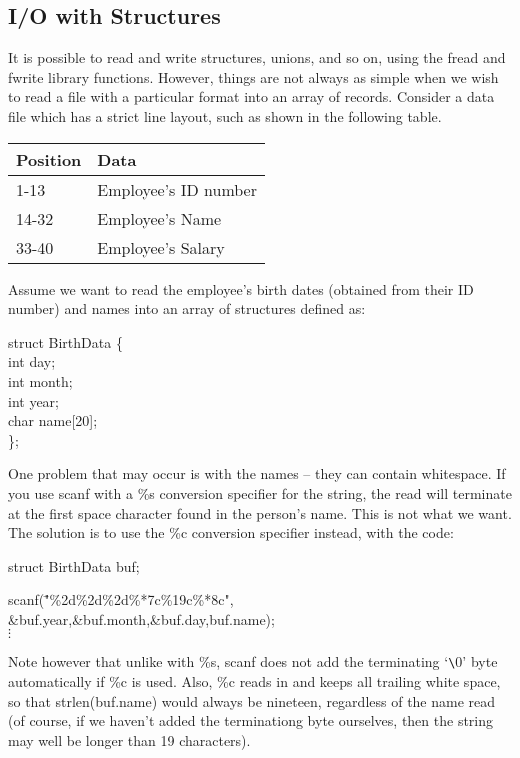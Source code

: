 \subsection{I/O with Structures}

It is possible to read and write structures, unions, and so on, using
the {\cd fread} and {\cd fwrite} library functions. However, things
are not always as simple when we wish to read a file with a
particular format into an array of records. Consider a data file
which has a strict line layout, such as shown in the following table.
\begin{center}
\begin{tabular}{l|l}
Position & Data\\
\hline
1-13 & Employee's ID number\\
14-32 & Employee's Name\\
33-40 & Employee's Salary\\
\end{tabular}
\end{center}
Assume we want to read the employee's birth dates (obtained from
their ID number) and names into an array of structures defined as:
\begin{code}
struct BirthData \{    \\
\>	int day;    \\
\>	int month;    \\
\>	int year;    \\
\>	char name[20];    \\
\};
\end{code}
\noindent
One problem that may occur is with the names -- they can contain
whitespace. If you use {\cd scanf} with a {\cd \%s} conversion
specifier for the string, the read will terminate at the first space
character found in the person's name. This is not what we want. The
solution is to use the {\cd \%c} conversion specifier instead, with
the code:
\begin{code}
struct BirthData buf; \\ \addVspace

scanf(\="\%2d\%2d\%2d\%*7c\%19c\%*8c", \\
\>	\&buf.year,\&buf.month,\&buf.day,buf.name);\\
$\vdots$
\end{code}
\noindent
Note however that unlike with {\cd \%s}, {\cd scanf} does not add the
terminating {\cd `\verb+\+0'} byte automatically if {\cd \%c} is used.
Also, {\cd \%c} reads in and keeps all trailing white space, so that
{\cd strlen(buf.name)} would always be nineteen, regardless of the
name read (of course, if we haven't added the terminationg byte
ourselves, then the string may well be longer than 19 characters).

